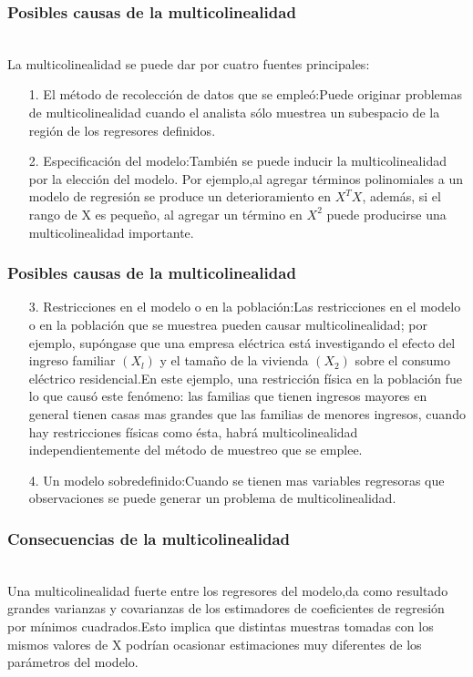 \documentclass[12pt]{beamer}
\begin{document}
\begin{frame}
\frametitle{Posibles causas de la multicolinealidad}
~\\La multicolinealidad se puede dar por cuatro fuentes principales:
\begin{itemize}
\item[1.]El método de recolección de datos que se empleó:Puede originar problemas de multicolinealidad cuando el analista sólo muestrea un subespacio de la región de los regresores definidos.
\item[2.]Especificación del modelo:También se puede inducir la multicolinealidad por la elección del modelo. Por ejemplo,al agregar términos polinomiales a un modelo de regresión se produce un deterioramiento en $X^{T}X$, además, si el rango de X es pequeño, al agregar un término en $X^{2}$ puede producirse una multicolinealidad importante.
\end{itemize}
\end{frame}

\begin{frame}
\frametitle{Posibles causas de la multicolinealidad}
\begin{itemize}
\item[3.]Restricciones en el modelo o en la población:Las restricciones en el modelo o en la población que se muestrea pueden causar multicolinealidad; por ejemplo, supóngase que una empresa eléctrica está investigando el efecto del ingreso familiar $(X_{l})$ y el tamaño de la vivienda $(X_{2})$ sobre el consumo eléctrico residencial.En este ejemplo, una restricción física en la población fue lo que causó este fenómeno: las familias que tienen ingresos mayores en general tienen casas mas grandes que las familias de menores ingresos, cuando hay restricciones físicas como ésta, habrá multicolinealidad independientemente del método de muestreo que se emplee.
\item[4.]Un modelo sobredefinido:Cuando se tienen mas variables regresoras que observaciones se puede generar un problema de multicolinealidad.
\end{itemize}
\end{frame}


\begin{frame}
\frametitle{Consecuencias de la multicolinealidad}
~\\Una multicolinealidad fuerte entre los regresores del modelo,da como resultado grandes varianzas y covarianzas de los estimadores de coeficientes de regresión por mínimos cuadrados.Esto implica que distintas muestras tomadas con los mismos valores de X podrían ocasionar estimaciones muy diferentes de los parámetros del modelo.
\end{frame}
\end{document}
